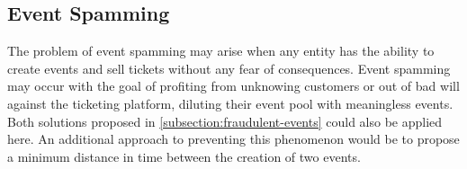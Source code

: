 \subsection{Event Spamming}\label{subsection:event-spamming}
The problem of event spamming may arise when any entity has the ability to create events and sell tickets without any fear of consequences. Event spamming may occur with the goal of profiting from unknowing customers or out of bad will against the ticketing platform, diluting their event pool with meaningless events.
Both solutions proposed in \ref{subsection:fraudulent-events} could also be applied here. An additional approach to preventing this phenomenon would be to propose a minimum distance in time between the creation of two events. 
